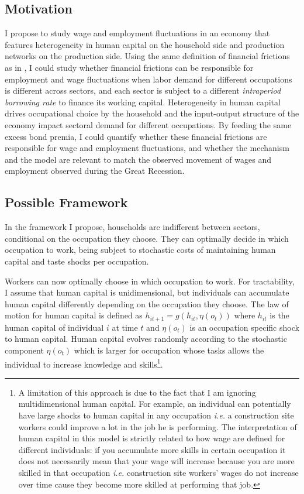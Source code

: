 \documentclass[english,letter,11pt,twoside]{article}
\begin{document}
\subsection*{Motivation}

I propose to study wage and employment fluctuations in an economy that features heterogeneity in human capital on the household side and production networks on the production side. Using the same definition of financial frictions as in \cite{bigio2020distortions}, I could study whether financial frictions can be responsible for employment and wage fluctuations when labor demand for different occupations is different across sectors, and each sector is subject to a different \textit{intraperiod borrowing rate} to finance its working capital. Heterogeneity in human capital drives occupational choice by the household and the input-output structure of the economy impact sectoral demand for different occupations. By feeding the same \cite{gilchrist2012credit} excess bond premia, I could quantify whether these financial frictions are responsible for wage and employment fluctuations, and whether the mechanism and the model are relevant to match the observed movement of wages and employment observed during the Great Recession.


\subsection*{Possible Framework} 

In the framework I propose, households are indifferent between sectors, conditional on the occupation they choose. They can optimally decide in which occupation to work, being subject to stochastic costs of maintaining human capital and taste shocks per occupation. 

Workers can now optimally choose in which occupation to work. For tractability, I assume that human capital is unidimensional, but individuals can accumulate human capital differently depending on the occupation they choose. The law of motion for human capital is defined as $h_{it+1} = g \left( h_{it},\eta(o_t) \right)$ where $h_{it}$ is the human capital of individual $i$ at time $t$ and $\eta \left( o_t \right)$ is an occupation specific shock to human capital. Human capital evolves randomly according to the stochastic component $\eta \left( o_t \right)$ which is larger for occupation whose tasks allows the individual to increase knowledge and skills\footnote{A limitation of this approach is due to the fact that I am ignoring multidimensional human capital. For example, an individual can potentially have large shocks to human capital in any occupation \textit{i.e.} a construction site workers could improve a lot in the job he is performing. The interpretation of human capital in this model is strictly related to how wage are defined for different individuals: if you accumulate more skills in certain occupation it does not necessarily mean that your wage will increase because you are more skilled in that occupation \textit{i.e.} construction site workers' wages do not increase over time cause they become more skilled at performing that job.}. 
\end{document}
